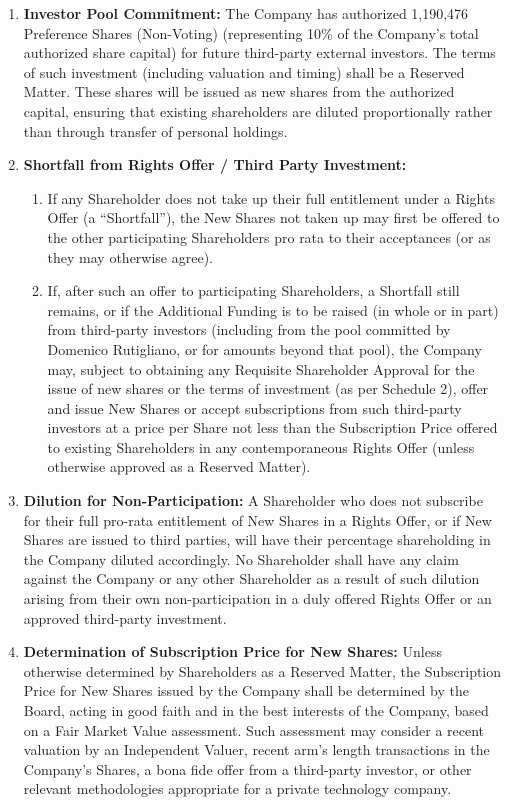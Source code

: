 \begin{enumerate}[label=(\alph*)]
\item \textbf{Investor Pool Commitment:} The Company has authorized 1,190,476 Preference Shares (Non-Voting) (representing 10\% of the Company's total authorized share capital) for future third-party external investors. The terms of such investment (including valuation and timing) shall be a Reserved Matter. These shares will be issued as new shares from the authorized capital, ensuring that existing shareholders are diluted proportionally rather than through transfer of personal holdings.
\item \textbf{Shortfall from Rights Offer / Third Party Investment:}
    \begin{enumerate}[label=(\roman*)]
    \item If any Shareholder does not take up their full entitlement under a Rights Offer (a ``Shortfall''), the New Shares not taken up may first be offered to the other participating Shareholders pro rata to their acceptances (or as they may otherwise agree).
    \item If, after such an offer to participating Shareholders, a Shortfall still remains, or if the Additional Funding is to be raised (in whole or in part) from third-party investors (including from the pool committed by Domenico Rutigliano, or for amounts beyond that pool), the Company may, subject to obtaining any Requisite Shareholder Approval for the issue of new shares or the terms of investment (as per Schedule 2), offer and issue New Shares or accept subscriptions from such third-party investors at a price per Share not less than the Subscription Price offered to existing Shareholders in any contemporaneous Rights Offer (unless otherwise approved as a Reserved Matter).
    \end{enumerate}
\item \textbf{Dilution for Non-Participation:} A Shareholder who does not subscribe for their full pro-rata entitlement of New Shares in a Rights Offer, or if New Shares are issued to third parties, will have their percentage shareholding in the Company diluted accordingly. No Shareholder shall have any claim against the Company or any other Shareholder as a result of such dilution arising from their own non-participation in a duly offered Rights Offer or an approved third-party investment.
\item \textbf{Determination of Subscription Price for New Shares:} Unless otherwise determined by Shareholders as a Reserved Matter, the Subscription Price for New Shares issued by the Company shall be determined by the Board, acting in good faith and in the best interests of the Company, based on a Fair Market Value assessment. Such assessment may consider a recent valuation by an Independent Valuer, recent arm's length transactions in the Company's Shares, a bona fide offer from a third-party investor, or other relevant methodologies appropriate for a private technology company.

\end{enumerate}
